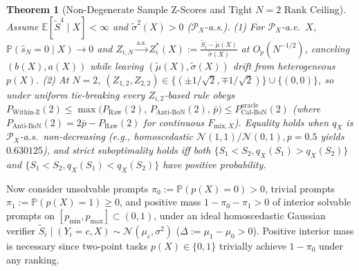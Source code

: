 \documentclass{article}
\theoremstyle{plain}
\newtheorem{theorem}{Theorem}
\theoremstyle{definition}
\theoremstyle{remark}
\newcommand{\E}{\mathbb{E}}
\newcommand{\Prob}{\mathbb{P}}
\begin{document}
\begin{theorem}[Non-Degenerate Sample Z-Scores and Tight $N=2$ Rank Ceiling]
\label{thm:zscore-n2}
Assume $\E[\tilde{S}^4 \mid X] < \infty$ and $\tilde{\sigma}^2(X) > 0$ ($\mathcal{P}_X$-a.s.). (1) For $\mathcal{P}_X$-a.e.\ $X$, $\Prob(\hat{s}_N = 0 \mid X) \to 0$ and $Z_{i,N} \xrightarrow{\mathrm{a.s.}} Z_i^*(X) := \frac{\tilde{S}_i - \tilde{\mu}(X)}{\tilde{\sigma}(X)}$ at $O_p(N^{-1/2})$, canceling $(b(X), a(X))$ while leaving $(\tilde{\mu}(X), \tilde{\sigma}(X))$ drift from heterogeneous $p(X)$. (2) At $N = 2$, $(Z_{1,2}, Z_{2,2}) \in \{(\pm 1/\sqrt{2}, \mp 1/\sqrt{2})\} \cup \{(0, 0)\}$, so under uniform tie-breaking every $Z_{i,2}$-based rule obeys $P_{\mathrm{Within\text{-}Z}}(2) \le \max\big(P_{\mathrm{Raw}}(2),\, P_{\mathrm{Anti\text{-}BoN}}(2),\, \bar{p}\big) \le P_{\mathrm{Cal\text{-}BoN}}^{\mathrm{oracle}}(2)$ (where $P_{\mathrm{Anti\text{-}BoN}}(2) = 2\bar{p} - P_{\mathrm{Raw}}(2)$ for continuous $F_{\mathrm{mix}, X}$). Equality holds when $q_X$ is $\mathcal{P}_X$-a.s.\ non-decreasing (e.g., homoscedastic $\mathcal{N}(1,1)/\mathcal{N}(0,1), p=0.5$ yields $0.630125$), and strict suboptimality holds \emph{iff} both $\{S_1 < S_2, q_X(S_1) > q_X(S_2)\}$ and $\{S_1 < S_2, q_X(S_1) < q_X(S_2)\}$ have positive probability.
\end{theorem}

Now consider unsolvable prompts $\pi_0 := \Prob(p(X) = 0) > 0$, trivial prompts $\pi_1 := \Prob(p(X) = 1) \ge 0$, and positive mass $1 - \pi_0 - \pi_1 > 0$ of interior solvable prompts on $[p_{\min}, p_{\max}] \subset (0, 1)$, under an ideal homoscedastic Gaussian verifier $\tilde{S}_i \mid (Y_i = c, X) \sim \mathcal{N}(\mu_c, \sigma^2)$ ($\Delta := \mu_1 - \mu_0 > 0$). Positive interior mass is necessary since two-point tasks $p(X) \in \{0, 1\}$ trivially achieve $1 - \pi_0$ under any ranking.
\end{document}

